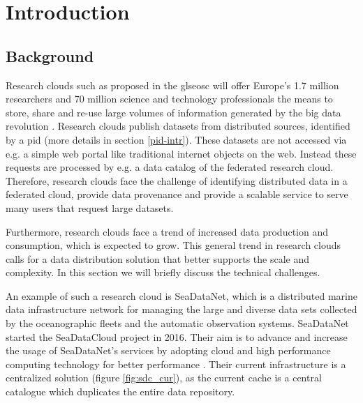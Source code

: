 \section{Introduction}

\subsection{Background}
\label{introduction-background}

Research clouds such as proposed in the gls{eosc} will offer Europe's 1.7 million researchers and 70 million science and technology professionals the means to store, share and re-use large volumes of information generated by the big data revolution \cite{eurocloud}. Research clouds publish datasets from distributed sources, identified by a \gls{pid} (more details in section \ref{pid-intr}). These datasets are not accessed via e.g. a simple web portal like traditional internet objects on the web. Instead these requests are processed by e.g. a data catalog of the federated research cloud. Therefore, research clouds face the challenge of identifying distributed data in a federated cloud, provide data provenance and provide a scalable service to serve many users that request large datasets.

Furthermore, research clouds face a trend of increased data production and consumption, which is expected to grow. This general trend in research clouds calls for a data distribution solution that better supports the scale and complexity. In this section we will briefly discuss the technical challenges.

An example of such a research cloud is SeaDataNet, which is a distributed marine data infrastructure network for managing the large and diverse data sets collected by the oceanographic fleets and the automatic observation systems. SeaDataNet started the SeaDataCloud project in 2016. Their aim is to advance and increase the usage of SeaDataNet's services by adopting cloud and high performance computing technology for better performance \cite{sdc}. Their current infrastructure is a centralized solution (figure \ref{fig:sdc_cur}), as the current cache is a central catalogue which duplicates the entire data repository.

